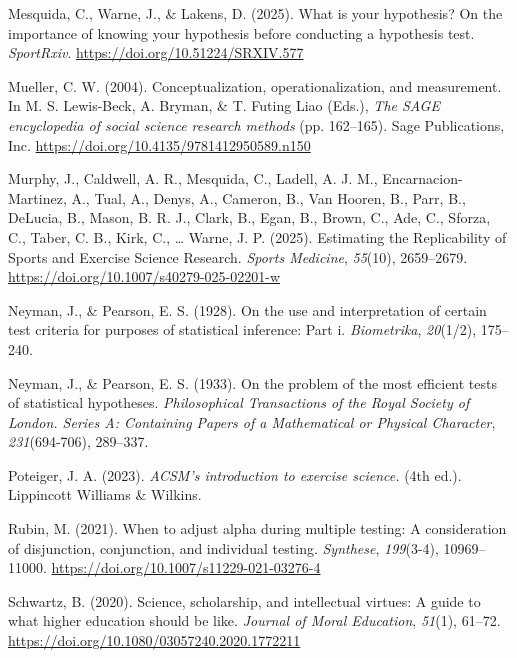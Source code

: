 \documentclass[
]{article}
\newlength{\cslhangindent}
\newenvironment{CSLReferences}[2] %
 {\begin{list}{}{%
  \setlength{\itemindent}{0pt}
  \setlength{\leftmargin}{0pt}
  \setlength{\parsep}{0pt}
  \ifodd #1
   \setlength{\leftmargin}{\cslhangindent}
   \setlength{\itemindent}{-1\cslhangindent}
  \fi
  \setlength{\itemsep}{#2\baselineskip}}}
 {\end{list}}
\begin{document}
\begin{CSLReferences}{1}{0}
Mesquida, C., Warne, J., \& Lakens, D. (2025). What is your hypothesis?
{On} the importance of knowing your hypothesis before conducting a
hypothesis test. \emph{SportRxiv}.
\url{https://doi.org/10.51224/SRXIV.577}

Mueller, C. W. (2004). Conceptualization, operationalization, and
measurement. In M. S. Lewis-Beck, A. Bryman, \& T. Futing Liao (Eds.),
\emph{The {SAGE} encyclopedia of social science research methods} (pp.
162--165). Sage Publications, Inc.
\url{https://doi.org/10.4135/9781412950589.n150}

Murphy, J., Caldwell, A. R., Mesquida, C., Ladell, A. J. M.,
Encarnacion-Martinez, A., Tual, A., Denys, A., Cameron, B., Van Hooren,
B., Parr, B., DeLucia, B., Mason, B. R. J., Clark, B., Egan, B., Brown,
C., Ade, C., Sforza, C., Taber, C. B., Kirk, C., \ldots{} Warne, J. P.
(2025). Estimating the {Replicability} of {Sports} and {Exercise}
{Science} {Research}. \emph{Sports Medicine}, \emph{55}(10), 2659--2679.
\url{https://doi.org/10.1007/s40279-025-02201-w}

Neyman, J., \& Pearson, E. S. (1928). On the use and interpretation of
certain test criteria for purposes of statistical inference: Part i.
\emph{Biometrika}, \emph{20}(1/2), 175--240.

Neyman, J., \& Pearson, E. S. (1933). On the problem of the most
efficient tests of statistical hypotheses. \emph{Philosophical
Transactions of the Royal Society of London. Series A: Containing Papers
of a Mathematical or Physical Character}, \emph{231}(694-706), 289--337.

Poteiger, J. A. (2023). \emph{ACSM's introduction to exercise science.}
(4th ed.). Lippincott Williams \& Wilkins.

Rubin, M. (2021). When to adjust alpha during multiple testing: A
consideration of disjunction, conjunction, and individual testing.
\emph{Synthese}, \emph{199}(3-4), 10969--11000.
\url{https://doi.org/10.1007/s11229-021-03276-4}

Schwartz, B. (2020). Science, scholarship, and intellectual virtues: {A}
guide to what higher education should be like. \emph{Journal of Moral
Education}, \emph{51}(1), 61--72.
\url{https://doi.org/10.1080/03057240.2020.1772211}


\end{CSLReferences}
\end{document}
